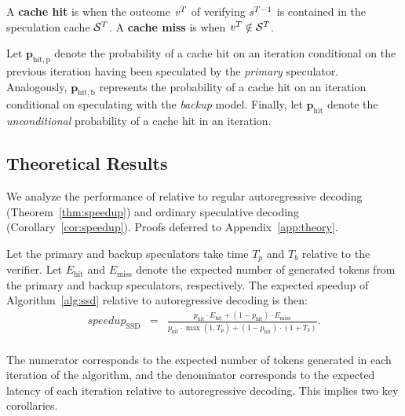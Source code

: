 \begin{definition}
A \textbf{cache hit} is when the outcome $\mathit{v}^T$ of verifying $\mathit{s}^{T-1}$ is contained in the speculation cache $\mathcal{S}^T$.
A \textbf{cache miss} is when $\mathit{v}^T \notin \mathcal{S}^T$.
\end{definition}

\begin{definition}
    Let $\mathbf{p_{\mathrm{hit,p}}}$ denote the probability of a cache hit on an iteration conditional on the previous iteration having been speculated by the \textit{primary} speculator. Analogously, $\mathbf{p_{\mathrm{hit, b}}}$ represents the probability of a cache hit on an iteration conditional on speculating with the \textit{backup} model. Finally, let $\mathbf{p_{\mathrm{hit}}}$ denote the \textit{unconditional} probability of a cache hit in an iteration. 
\end{definition}



\subsection{Theoretical Results}
\label{sec:ssd_theory}
We analyze the performance of \Sys relative to regular autoregressive decoding (Theorem~\ref{thm:speedup}) and ordinary speculative decoding (Corollary~\ref{cor:speedup}).
Proofs deferred to Appendix~\ref{app:theory}.

\begin{theorem}
\label{thm:speedup}
Let the primary and backup speculators take time $T_p$ and $T_b$ relative to the verifier. Let $E_{\mathrm{hit}}$ and $E_{\mathrm{miss}}$ denote the expected number of generated tokens from the primary and backup speculators, respectively. The expected speedup of Algorithm~\ref{alg:ssd} relative to autoregressive decoding is then: 
\begin{eqnarray*}
speedup_{\mathrm{SSD}} &=& \frac{p_{\mathrm{hit}} \cdot E_{\mathrm{hit}} + (1-p_{\mathrm{hit}}) \cdot E_{\mathrm{miss}}}{p_{\mathrm{hit}} \cdot \max(1, T_p) + (1-p_{\mathrm{hit}}) \cdot (1 + T_b)}. \\
\end{eqnarray*}

\end{theorem}
The numerator corresponds to the expected number of tokens generated in each iteration of the algorithm, and the denominator corresponds to the expected latency of each iteration relative to autoregressive decoding. This implies two key corollaries. 

